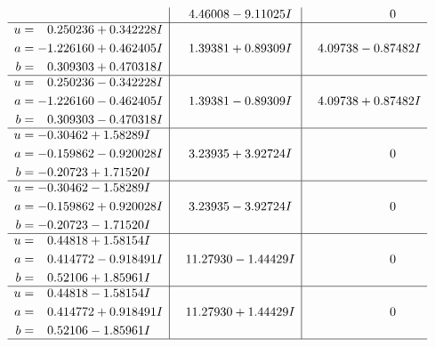 \documentclass[1p]{elsarticle_modified}
\theoremstyle{definition}
\begin{document}
$$\begin{array}{c|c|c}
 & \phantom{-}4.46008 - 9.11025 I & \phantom{-0.000000 } 0 \\ \hline\begin{aligned}
u &= \phantom{-}0.250236 + 0.342228 I \\
a &= -1.226160 + 0.462405 I \\
b &= \phantom{-}0.309303 + 0.470318 I\end{aligned}
 & \phantom{-}1.39381 + 0.89309 I & \phantom{-}4.09738 - 0.87482 I \\ \hline\begin{aligned}
u &= \phantom{-}0.250236 - 0.342228 I \\
a &= -1.226160 - 0.462405 I \\
b &= \phantom{-}0.309303 - 0.470318 I\end{aligned}
 & \phantom{-}1.39381 - 0.89309 I & \phantom{-}4.09738 + 0.87482 I \\ \hline\begin{aligned}
u &= -0.30462 + 1.58289 I \\
a &= -0.159862 - 0.920028 I \\
b &= -0.20723 + 1.71520 I\end{aligned}
 & \phantom{-}3.23935 + 3.92724 I & \phantom{-0.000000 } 0 \\ \hline\begin{aligned}
u &= -0.30462 - 1.58289 I \\
a &= -0.159862 + 0.920028 I \\
b &= -0.20723 - 1.71520 I\end{aligned}
 & \phantom{-}3.23935 - 3.92724 I & \phantom{-0.000000 } 0 \\ \hline\begin{aligned}
u &= \phantom{-}0.44818 + 1.58154 I \\
a &= \phantom{-}0.414772 - 0.918491 I \\
b &= \phantom{-}0.52106 + 1.85961 I\end{aligned}
 & \phantom{-}11.27930 - 1.44429 I & \phantom{-0.000000 } 0 \\ \hline\begin{aligned}
u &= \phantom{-}0.44818 - 1.58154 I \\
a &= \phantom{-}0.414772 + 0.918491 I \\
b &= \phantom{-}0.52106 - 1.85961 I\end{aligned}
 & \phantom{-}11.27930 + 1.44429 I & \phantom{-0.000000 } 0\\
 \hline 
 \end{array}$$\newpage$$\begin{array}{c|c|c}  

\end{array}$$
\end{document}
